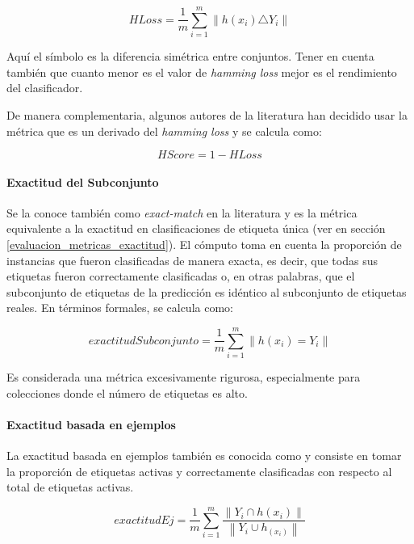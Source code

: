 \begin{equation}
   HLoss = \frac{1}{m} \sum_{i=1}^{m} \left\|h(x_{i}) \triangle Y_{i}\right\|
\end{equation}

Aquí el símbolo \comillas{$\triangle$} es la diferencia simétrica entre
conjuntos. Tener en cuenta también que cuanto menor es el valor de
\textit{hamming loss} mejor es el rendimiento del clasificador. 

De manera complementaria, algunos autores de la literatura han decidido usar la
métrica  que es un derivado del \textit{hamming
loss} y se calcula como:

\begin{equation}
   HScore = 1 - HLoss
\end{equation}

\paragraph{Exactitud del Subconjunto} Se la conoce también como
\textit{exact-match} en la literatura y es la métrica equivalente a la exactitud
en clasificaciones de etiqueta única (ver  en sección
\ref{evaluacion_metricas_exactitud}). El cómputo toma en cuenta la proporción de
instancias que fueron clasificadas de manera exacta, es decir, que todas sus
etiquetas fueron correctamente clasificadas o, en otras palabras, que el
subconjunto de etiquetas de la predicción es idéntico al subconjunto de
etiquetas reales. En términos formales, se calcula como:

\begin{equation}
   exactitudSubconjunto = \frac{1}{m} \sum_{i=1}^{m} \left\|h(x_{i}) =
   Y_{i}\right\|
\end{equation}

Es considerada una métrica excesivamente rigurosa, especialmente para
colecciones donde el número de etiquetas es alto.

\paragraph{Exactitud basada en ejemplos} 

La exactitud basada en ejemplos también es conocida como  y consiste en tomar la proporción de etiquetas activas y correctamente
clasificadas con respecto al total de etiquetas activas.

\begin{equation} 
   exactitudEj = \frac{1}{m} \sum_{i=1}^{m} 
   \frac{\left\|Y_{i} \cap h(x_{i})\right\|}
   {\left\|Y_{i} \cup h_(x_{i})\right\|} 
\end{equation}


